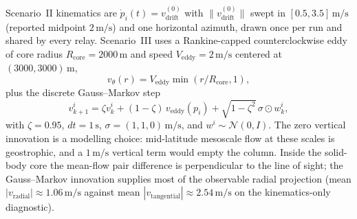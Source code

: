 Scenario~II kinematics are
$\dot{p}_i(t)=v_{\mathrm{drift}}^{(0)}$ with
$\|v_{\mathrm{drift}}^{(0)}\|$ swept in
$[0.5,3.5]\,\mathrm{m/s}$ (reported midpoint $2\,\mathrm{m/s}$)
and one horizontal azimuth, drawn once per run and shared by every relay.
Scenario~III uses a Rankine-capped counterclockwise eddy of core
radius $R_{\mathrm{core}}=2000\,\mathrm{m}$ and speed
$V_{\mathrm{eddy}}=2\,\mathrm{m/s}$ centered at $(3000,3000)\,\mathrm{m}$,
\begin{equation}
\label{eq:rankine}
v_\theta(r)=V_{\mathrm{eddy}}\min(r/R_{\mathrm{core}},1),
\end{equation}
plus the discrete Gauss--Markov step
\begin{equation}
\label{eq:gm}
v^i_{k+1}
= \zeta v^i_k + (1-\zeta)\,v_{\mathrm{eddy}}(p_i)
+ \sqrt{1-\zeta^2}\,\sigma\odot w^i_k,
\end{equation}
with $\zeta=0.95$, $dt=1\,\mathrm{s}$,
$\sigma=(1,1,0)\,\mathrm{m/s}$, and $w^i\sim\mathcal{N}(0,I)$.
The zero vertical innovation is a modelling choice: mid-latitude
mesoscale flow at these scales is geostrophic, and a $1\,\mathrm{m/s}$
vertical term would empty the column.
Inside the solid-body core the mean-flow pair difference is
perpendicular to the line of sight; the Gauss--Markov innovation
supplies most of the observable radial projection
(mean $|v_{\mathrm{radial}}|\approx 1.06\,\mathrm{m/s}$ against
mean $|v_{\mathrm{tangential}}|\approx 2.54\,\mathrm{m/s}$ on the
kinematics-only diagnostic).

